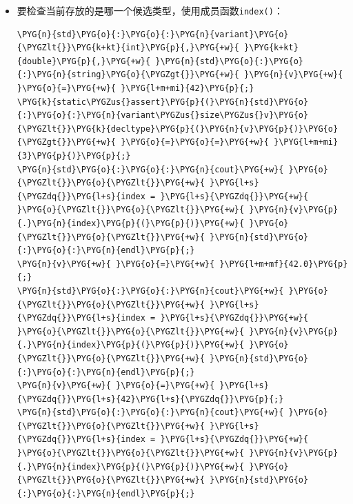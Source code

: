 \begin{itemize}

\item 要检查当前存放的是哪一个候选类型，使用成员函数\texttt{index()}：



\begin{codeblockbg}
\begin{Verbatim}[commandchars=\\\{\},breaklines=true,breakanywhere=true,fontsize=\codefont,xleftmargin=17bp]
\PYG{n}{std}\PYG{o}{:}\PYG{o}{:}\PYG{n}{variant}\PYG{o}{\PYGZlt{}}\PYG{k+kt}{int}\PYG{p}{,}\PYG{+w}{ }\PYG{k+kt}{double}\PYG{p}{,}\PYG{+w}{ }\PYG{n}{std}\PYG{o}{:}\PYG{o}{:}\PYG{n}{string}\PYG{o}{\PYGZgt{}}\PYG{+w}{ }\PYG{n}{v}\PYG{+w}{ }\PYG{o}{=}\PYG{+w}{ }\PYG{l+m+mi}{42}\PYG{p}{;}
\PYG{k}{static\PYGZus{}assert}\PYG{p}{(}\PYG{n}{std}\PYG{o}{:}\PYG{o}{:}\PYG{n}{variant\PYGZus{}size\PYGZus{}v}\PYG{o}{\PYGZlt{}}\PYG{k}{decltype}\PYG{p}{(}\PYG{n}{v}\PYG{p}{)}\PYG{o}{\PYGZgt{}}\PYG{+w}{ }\PYG{o}{=}\PYG{o}{=}\PYG{+w}{ }\PYG{l+m+mi}{3}\PYG{p}{)}\PYG{p}{;}
\PYG{n}{std}\PYG{o}{:}\PYG{o}{:}\PYG{n}{cout}\PYG{+w}{ }\PYG{o}{\PYGZlt{}}\PYG{o}{\PYGZlt{}}\PYG{+w}{ }\PYG{l+s}{\PYGZdq{}}\PYG{l+s}{index = }\PYG{l+s}{\PYGZdq{}}\PYG{+w}{ }\PYG{o}{\PYGZlt{}}\PYG{o}{\PYGZlt{}}\PYG{+w}{ }\PYG{n}{v}\PYG{p}{.}\PYG{n}{index}\PYG{p}{(}\PYG{p}{)}\PYG{+w}{ }\PYG{o}{\PYGZlt{}}\PYG{o}{\PYGZlt{}}\PYG{+w}{ }\PYG{n}{std}\PYG{o}{:}\PYG{o}{:}\PYG{n}{endl}\PYG{p}{;}
\PYG{n}{v}\PYG{+w}{ }\PYG{o}{=}\PYG{+w}{ }\PYG{l+m+mf}{42.0}\PYG{p}{;}
\PYG{n}{std}\PYG{o}{:}\PYG{o}{:}\PYG{n}{cout}\PYG{+w}{ }\PYG{o}{\PYGZlt{}}\PYG{o}{\PYGZlt{}}\PYG{+w}{ }\PYG{l+s}{\PYGZdq{}}\PYG{l+s}{index = }\PYG{l+s}{\PYGZdq{}}\PYG{+w}{ }\PYG{o}{\PYGZlt{}}\PYG{o}{\PYGZlt{}}\PYG{+w}{ }\PYG{n}{v}\PYG{p}{.}\PYG{n}{index}\PYG{p}{(}\PYG{p}{)}\PYG{+w}{ }\PYG{o}{\PYGZlt{}}\PYG{o}{\PYGZlt{}}\PYG{+w}{ }\PYG{n}{std}\PYG{o}{:}\PYG{o}{:}\PYG{n}{endl}\PYG{p}{;}
\PYG{n}{v}\PYG{+w}{ }\PYG{o}{=}\PYG{+w}{ }\PYG{l+s}{\PYGZdq{}}\PYG{l+s}{42}\PYG{l+s}{\PYGZdq{}}\PYG{p}{;}
\PYG{n}{std}\PYG{o}{:}\PYG{o}{:}\PYG{n}{cout}\PYG{+w}{ }\PYG{o}{\PYGZlt{}}\PYG{o}{\PYGZlt{}}\PYG{+w}{ }\PYG{l+s}{\PYGZdq{}}\PYG{l+s}{index = }\PYG{l+s}{\PYGZdq{}}\PYG{+w}{ }\PYG{o}{\PYGZlt{}}\PYG{o}{\PYGZlt{}}\PYG{+w}{ }\PYG{n}{v}\PYG{p}{.}\PYG{n}{index}\PYG{p}{(}\PYG{p}{)}\PYG{+w}{ }\PYG{o}{\PYGZlt{}}\PYG{o}{\PYGZlt{}}\PYG{+w}{ }\PYG{n}{std}\PYG{o}{:}\PYG{o}{:}\PYG{n}{endl}\PYG{p}{;}
\end{Verbatim}
\end{codeblockbg}




\end{itemize}
